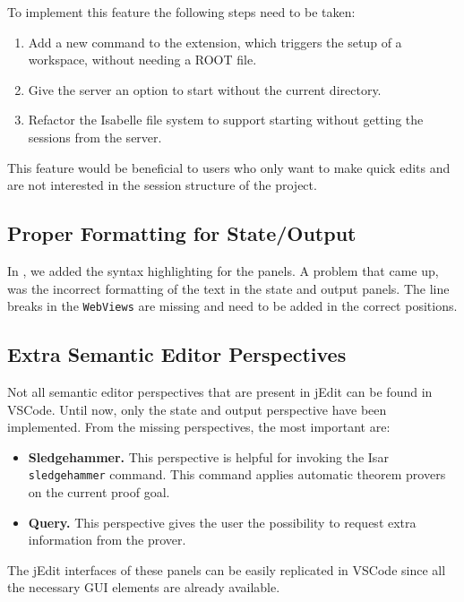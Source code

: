 To implement this feature the following steps need to be taken:
\begin{enumerate}
    \item Add a new command to the extension, which triggers the setup of a workspace, without needing a ROOT file.
    \item Give the server an option to start without the current directory.
    \item Refactor the Isabelle file system to support starting without getting the sessions from the server.
\end{enumerate}

This feature would be beneficial to users who only want to make quick edits and are not interested in the session structure of the project.

\subsection{Proper Formatting for State/Output}
In , we added the syntax highlighting for the panels. A problem that came up, was the incorrect formatting of the text in the state and output panels. The line breaks in the \texttt{WebViews} are missing and need to be added in the correct positions.

\subsection{Extra Semantic Editor Perspectives}
Not all semantic editor perspectives that are present in jEdit can be found in VSCode. Until now, only the state and output perspective have been implemented. From the missing perspectives, the most important are:
\begin{itemize}
    \item \textbf{Sledgehammer.} This perspective is helpful for invoking the Isar \texttt{sledgehammer} command. This command applies automatic theorem provers on the current proof goal.
    \item \textbf{Query.} This perspective gives the user the possibility to request extra information from the prover.
\end{itemize}

The jEdit interfaces of these panels can be easily replicated in VSCode since all the necessary GUI elements are already available.


